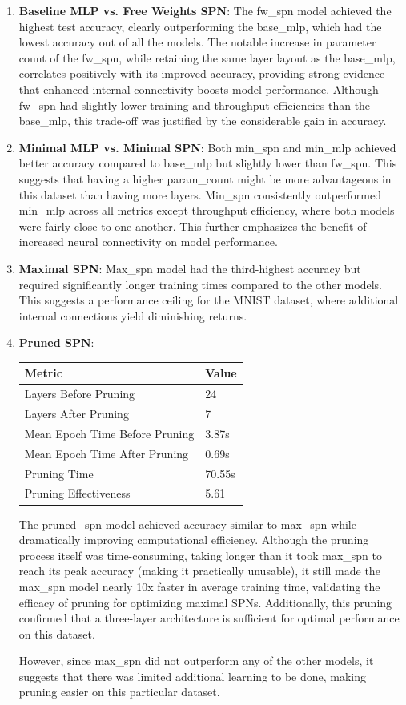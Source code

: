 \begin{enumerate}
\item \textbf{Baseline MLP vs. Free Weights SPN}: The fw\_spn model achieved the highest test accuracy, clearly outperforming the base\_mlp, which had the lowest accuracy out of all the models. The notable increase in parameter count of the fw\_spn, while retaining the same layer layout as the base\_mlp, correlates positively with its improved accuracy, providing strong evidence that enhanced internal connectivity boosts model performance. Although fw\_spn had slightly lower training and throughput efficiencies than the base\_mlp, this trade-off was justified by the considerable gain in accuracy.
\item \textbf{Minimal MLP vs. Minimal SPN}: Both min\_spn and min\_mlp achieved better accuracy compared to base\_mlp but slightly lower than fw\_spn. This suggests that having a higher param\_count might be more advantageous in this dataset than having more layers. Min\_spn consistently outperformed min\_mlp across all metrics except throughput efficiency, where both models were fairly close to one another. This further emphasizes the benefit of increased neural connectivity on model performance.
\item \textbf{Maximal SPN}: Max\_spn model had the third-highest accuracy but required significantly longer training times compared to the other models. This suggests a performance ceiling for the MNIST dataset, where additional internal connections yield diminishing returns.
\item \textbf{Pruned SPN}:
\begin{center}  %
\begin{tabular}{|l|l|}
\hline
\textbf{Metric} & \textbf{Value} \\
\hline
Layers Before Pruning & 24 \\
Layers After Pruning & 7 \\
Mean Epoch Time Before Pruning & 3.87s \\
Mean Epoch Time After Pruning & 0.69s \\
Pruning Time & 70.55s \\
Pruning Effectiveness & 5.61 \\
\hline
\end{tabular}
\end{center}
The pruned\_spn model achieved accuracy similar to max\_spn while dramatically improving computational efficiency. Although the pruning process itself was time-consuming, taking longer than it took max\_spn to reach its peak accuracy (making it practically unusable), it still made the max\_spn model nearly 10x faster in average training time, validating the efficacy of pruning for optimizing maximal SPNs. Additionally, this pruning confirmed that a three-layer architecture is sufficient for optimal performance on this dataset. 

However, since max\_spn did not outperform any of the other models, it suggests that there was limited additional learning to be done, making pruning easier on this particular dataset.
\end{enumerate}

